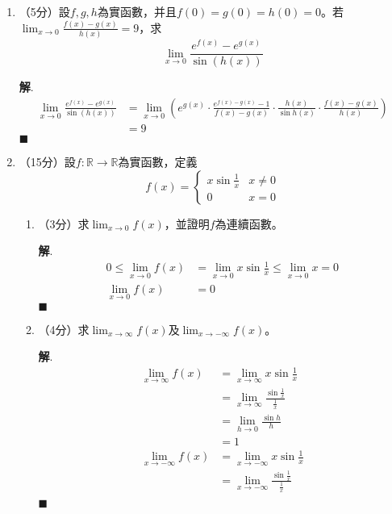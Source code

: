 \documentclass[12pt]{article}
\newenvironment*{sol}{\par \textbf{解}.}{\hfill$\blacksquare$}
\begin{document}
    \begin{enumerate}
        \item （5分）設$f,g,h$為實函數，并且$f(0)=g(0)=h(0)=0$。若$\lim_{x\to 0}\frac{f(x)-g(x)}{h(x)}=9$，求$$\lim_{x\to 0}\frac{e^{f(x)}-e^{g(x)}}{\sin(h(x))}$$\begin{sol}
            \begin{align*}
                \lim_{x\to 0}\frac{e^{f(x)}-e^{g(x)}}{\sin(h(x))}&=\lim_{x\to 0}(e^{g(x)}\cdot\frac{e^{f(x)-g(x)}-1}{f(x)-g(x)}\cdot\frac{h(x)}{\sin{h(x)}}\cdot\frac{f(x)-g(x)}{h(x)})\\
                &=9
            \end{align*}
        \end{sol}
        \item （15分）設$f:\mathbb{R}\to \mathbb{R}$為實函數，定義$$f(x)=\begin{cases}
            x\sin{\frac{1}{x}}&x\neq 0\\
            0&x=0
        \end{cases}$$\begin{enumerate}
            \item （3分）求$\displaystyle \lim_{x\to 0}f(x)$，並證明$f$為連續函數。\begin{sol}
                \begin{align*}
                    0\leq \lim_{x\to 0}f(x)&=\lim_{x\to 0}x\sin{\frac{1}{x}}\leq \lim_{x\to 0}x=0\\
                    \lim_{x\to 0}f(x)&=0
                \end{align*}
            \end{sol}
            \item （4分）求$\displaystyle \lim_{x\to \infty}f(x)$及$\displaystyle \lim_{x\to -\infty}f(x)$。\begin{sol}
                \begin{align*}
                    \lim_{x\to \infty}f(x)&=\lim_{x\to \infty}x\sin{\frac{1}{x}}\\
                    &=\lim_{x\to \infty}\frac{\sin{\frac{1}{x}}}{\frac{1}{x}}\\
                    &=\lim_{h\to 0}\frac{\sin{h}}{h}\\
                    &=1\\
                    \lim_{x\to -\infty}f(x)&=\lim_{x\to -\infty}x\sin{\frac{1}{x}}\\
                    &=\lim_{x\to -\infty}\frac{\sin{\frac{1}{x}}}{\frac{1}{x}}\\

\end{align*}
\end{sol}
\end{enumerate}
\end{enumerate}
\end{document}

